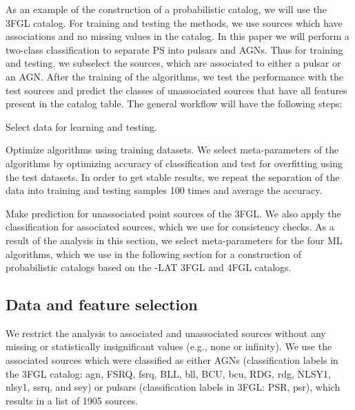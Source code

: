 As an example of the construction of a probabilistic catalog, we will use the 3FGL catalog.
For training and testing the methods, we use sources which have associations and no missing values in the catalog.
In this paper we will perform a two-class classification to separate PS into pulsars and AGNs.
Thus for training and testing, we subselect the sources, which are associated to either a pulsar or an AGN.
After the training of the algorithms, we test the performance with the test sources and predict the classes of unassociated sources that have all features present in the catalog table.
The general workflow will have the following steps:
\ben
\item
Select data for learning and testing.
\item
Optimize algorithms using training datasets.
We select meta-parameters of the algorithms by optimizing accuracy of classification and test for overfitting using the test datasets.
In order to get stable results, we repeat the separation of the data into training and testing samples 100 times and 
average the accuracy.
\item
Make prediction for unassociated point sources of the 3FGL.
We also apply the classification for associated sources, which we use for consistency checks.
\een
As a result of the analysis in this section, we select meta-parameters for the four ML algorithms,
which we use in the following section for a construction of probabilistic catalogs
based on the \Fermi-LAT 3FGL and 4FGL catalogs.


\subsection{Data and feature selection}

We restrict the analysis to associated and unassociated sources without any missing or statistically insignificant values (e.g., none or infinity). 
We use the associated sources which were classified as either AGNs (classification labels in the 3FGL catalog: agn, FSRQ, fsrq, BLL, bll, BCU, bcu, RDG, rdg, NLSY1, nlsy1, ssrq, and sey) or pulsars (classification labels in 3FGL: PSR, psr), which results in a list of 1905 sources. 

